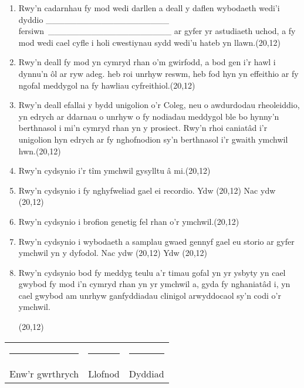 \documentclass[a4paper,10pt]{article}
\begin{document}
 \begin{enumerate}
  \item Rwy'n cadarnhau fy mod wedi darllen a deall y daflen wybodaeth wedi'i dyddio
	\_\_\_\_\_\_\_\_\_\_\_\_\_\_\_\_\_\_\_\_ fersiwn \_\_\_\_\_\_\_\_\_\_\_\_\_\_\_\_\_\_\_\_ ar gyfer yr astudiaeth uchod, a fy mod wedi cael cyfle i holi cwestiynau sydd wedi'u hateb yn llawn.\hfill \framebox(20,12){}
  \item Rwy'n deall fy mod yn cymryd rhan o'm gwirfodd, a bod gen i'r hawl i dynnu'n \^{o}l ar ryw adeg. heb roi unrhyw reswm, heb fod hyn yn effeithio ar fy ngofal meddygol na fy hawliau cyfreithiol.\hfill \framebox(20,12){}
  \item Rwy'n deall efallai y bydd unigolion o'r Coleg, neu o awdurdodau rheoleiddio, yn edrych ar ddarnau o unrhyw o fy nodiadau meddygol ble bo hynny'n berthnasol i mi'n cymryd rhan yn y prosiect. Rwy'n rhoi caniat\^{a}d i'r unigolion hyn edrych ar fy nghofnodion sy'n berthnasol i'r gwaith ymchwil  hwn.\hfill \framebox(20,12){}
  \item Rwy'n cydsynio i'r t\^{i}m ymchwil gysylltu \^{a} mi.\hfill \framebox(20,12){}
  \item Rwy'n cydsynio i fy nghyfweliad gael ei recordio.    \hfill Ydw \framebox(20,12){} Nac ydw \framebox(20,12){}
  \item Rwy'n cydsynio i brofion genetig fel rhan o'r ymchwil.\hfill \framebox(20,12){}
  \item  Rwy'n cydsynio i wybodaeth a samplau gwaed gennyf gael eu storio ar gyfer ymchwil yn y dyfodol. 
      \hfill Nac ydw \framebox(20,12){} Ydw \framebox(20,12){}
  \item Rwy'n cydsynio bod fy meddyg teulu a'r timau gofal yn yr ysbyty yn cael gwybod fy mod i'n cymryd rhan yn yr ymchwil a, gyda fy nghaniat\^{a}d i, yn cael gwybod am unrhyw ganfyddiadau clinigol arwyddocaol sy'n codi o'r ymchwil.
      \begin{flushright} \framebox(20,12){} \end{flushright}
	
 \end{enumerate}

\vspace{0.5cm}

 \begin{tabular}{p{4cm}p{4cm}p{4cm}}
    \rule{10em}{.3pt} & \rule{10em}{.3pt} & \rule{10em}{.3pt} \\
     Enw'r gwrthrych  & Llofnod  & Dyddiad \\
 \end{tabular}
\end{document}
